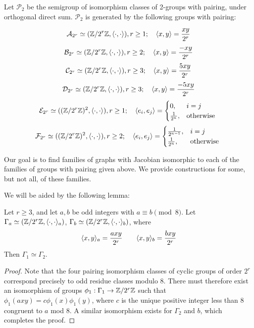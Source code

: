 \documentclass{amsart}
\begin{document}
\begin{prop}
  Let $\mathcal{P}_{2}$ be the semigroup of isomorphism classes of
  2-groups with pairing, under orthogonal direct
  sum. $\mathcal{P}_{2}$ is generated by the following groups with pairing:

  \[ \mathcal{A}_{2^{r}} \simeq (\mathbb{Z}/2^r\mathbb{Z}, \langle \cdot, \cdot \rangle), r \ge 1; \quad
  \langle x, y \rangle = \frac{xy}{2^r}\]
  \[ \mathcal{B}_{2^{r}} \simeq (\mathbb{Z}/2^r\mathbb{Z}, \langle \cdot, \cdot \rangle), r \ge 2; \quad
  \langle x, y \rangle = \frac{-xy}{2^r}\]
  \[ \mathcal{C}_{2^{r}} \simeq (\mathbb{Z}/2^r\mathbb{Z}, \langle \cdot, \cdot \rangle), r \ge 3; \quad
  \langle x, y \rangle = \frac{5xy}{2^r}\]
  \[ \mathcal{D}_{2^{r}} \simeq (\mathbb{Z}/2^r\mathbb{Z}, \langle \cdot, \cdot \rangle), r \ge 3; \quad
  \langle x, y \rangle = \frac{-5xy}{2^r}\]
  \[ \mathcal{E}_{2^{r}} \simeq ((\mathbb{Z}/2^r\mathbb{Z})^2, \langle \cdot, \cdot \rangle), r \ge 1; \quad
  \langle e_i, e_j \rangle = 
  \begin{cases}
    0, & i = j\\
    \frac{1}{2^{n}}, & \textrm{otherwise }
  \end{cases}
   \]
   \[ \mathcal{F}_{2^{r}} \simeq ((\mathbb{Z}/2^r\mathbb{Z})^2, \langle \cdot, \cdot \rangle), r \ge 2; \quad
   \langle e_i, e_j \rangle = 
   \begin{cases}
     \frac{1}{2^{n-1}}, & i = j\\
     \frac{1}{2^{n}}, & \textrm{otherwise }
   \end{cases}
   \]   
 \end{prop}

 Our goal is to find families of graphs with Jacobian isomorphic to
 each of the families of groups with pairing given above. We provide
 constructions for some, but not all, of these families. 

 We will be aided by the following lemma:

\begin{lem}
 \label{lem:2group_pairing_iso}
 Let $r \ge 3$, and let $a,b$ be odd integers with $a \equiv b \pmod
 8$. Let $\Gamma_a \simeq (\mathbb{Z}/2^r\mathbb{Z}, \langle \cdot, \cdot \rangle_a)$,
 $\Gamma_b \simeq (\mathbb{Z}/2^r\mathbb{Z}, \langle \cdot, \cdot \rangle_b)$, where 
 \begin{equation*}
  \langle x, y \rangle_a = \frac{axy}{2^r} \qquad \langle x, y \rangle_b = \frac{bxy}{2^r}
 \end{equation*}
 Then $\Gamma_1 \simeq \Gamma_2$.
\end{lem}
\begin{proof}
  Note that the four pairing isomorphism classes of cyclic groups of
  order $2^r$ correspond precisely to odd residue classes modulo
  $8$. There must therefore exist an isomorphism of groups
  $\phi_1:\Gamma_1 \to \mathbb{Z}/2^r\mathbb{Z}$ such that $\phi_1(axy) =
  c\phi_1(x)\phi_1(y)$, where $c$ is the unique positive integer less
  than $8$ congruent to $a$ mod $8$. A similar isomorphism exists for
  $\Gamma_2$ and $b$, which completes the proof.
\end{proof}
\end{document}
